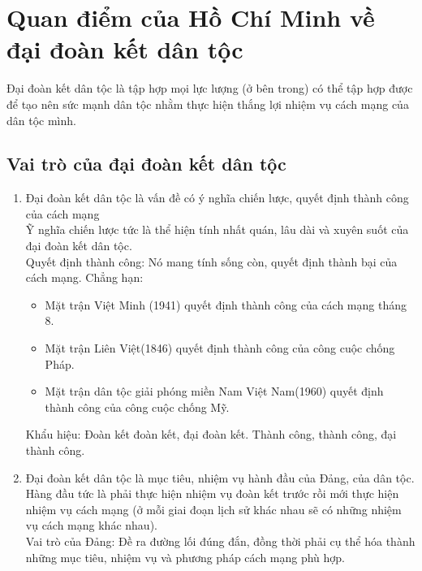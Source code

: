 \documentclass{article}
\begin{document}
	\section{Quan điểm của Hồ Chí Minh về đại đoàn kết dân tộc}
	Đại đoàn kết dân tộc là tập hợp mọi lực lượng (ở bên trong) có thể tập hợp được để tạo nên sức mạnh dân tộc nhằm thực hiện thắng lợi nhiệm vụ cách mạng của dân tộc mình.\\

	\subsection{Vai trò của đại đoàn kết dân tộc}
	\begin{enumerate}
		\item Đại đoàn kết dân tộc là vấn đề có ý nghĩa chiến lược, quyết định thành công của cách mạng\\
		Ỹ nghĩa chiến lược tức là thể hiện tính nhất quán, lâu dài và xuyên suốt của đại đoàn kết dân tộc.\\
		Quyết định thành công: Nó mang tính sống còn, quyết định thành bại của cách mạng. Chẳng hạn: 
		\begin{itemize}
			\item Mặt trận Việt Minh (1941) quyết định thành công của cách mạng tháng 8. 
			\item Mặt trận Liên Việt(1846) quyết định thành công của công cuộc chống Pháp. 
			\item Mặt trận dân tộc giải phóng miền Nam Việt Nam(1960) quyết định thành công của công cuộc chống Mỹ.
		\end{itemize}
		Khẩu hiệu: Đoàn kết đoàn kết, đại đoàn kết. Thành công, thành công, đại thành công.
		\item Đại đoàn kết dân tộc là mục tiêu, nhiệm vụ hành đầu của Đảng, của dân tộc.\\
		Hàng đầu tức là phải thực hiện nhiệm vụ đoàn kết trước rồi mới thực hiện nhiệm vụ cách mạng (ở mỗi giai đoạn lịch sử khác nhau sẽ có những nhiệm vụ cách mạng khác nhau).\\
		Vai trò của Đảng: Đề ra đường lối đúng đắn, đồng thời phải cụ thể hóa thành những mục tiêu, nhiệm vụ và phương pháp cách mạng phù hợp.
	\end{enumerate}
\end{document}
